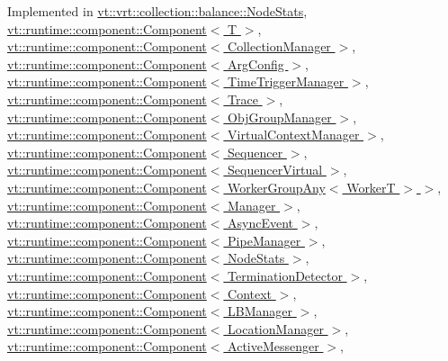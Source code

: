 Implemented in \hyperlink{structvt_1_1vrt_1_1collection_1_1balance_1_1_node_stats_a0c60d1566daa6465f56b09e27058d6a1}{vt\+::vrt\+::collection\+::balance\+::\+Node\+Stats}, \hyperlink{structvt_1_1runtime_1_1component_1_1_component_a7f07384d294e59796add9ce6be2d6410}{vt\+::runtime\+::component\+::\+Component$<$ T $>$}, \hyperlink{structvt_1_1runtime_1_1component_1_1_component_a7f07384d294e59796add9ce6be2d6410}{vt\+::runtime\+::component\+::\+Component$<$ Collection\+Manager $>$}, \hyperlink{structvt_1_1runtime_1_1component_1_1_component_a7f07384d294e59796add9ce6be2d6410}{vt\+::runtime\+::component\+::\+Component$<$ Arg\+Config $>$}, \hyperlink{structvt_1_1runtime_1_1component_1_1_component_a7f07384d294e59796add9ce6be2d6410}{vt\+::runtime\+::component\+::\+Component$<$ Time\+Trigger\+Manager $>$}, \hyperlink{structvt_1_1runtime_1_1component_1_1_component_a7f07384d294e59796add9ce6be2d6410}{vt\+::runtime\+::component\+::\+Component$<$ Trace $>$}, \hyperlink{structvt_1_1runtime_1_1component_1_1_component_a7f07384d294e59796add9ce6be2d6410}{vt\+::runtime\+::component\+::\+Component$<$ Obj\+Group\+Manager $>$}, \hyperlink{structvt_1_1runtime_1_1component_1_1_component_a7f07384d294e59796add9ce6be2d6410}{vt\+::runtime\+::component\+::\+Component$<$ Virtual\+Context\+Manager $>$}, \hyperlink{structvt_1_1runtime_1_1component_1_1_component_a7f07384d294e59796add9ce6be2d6410}{vt\+::runtime\+::component\+::\+Component$<$ Sequencer $>$}, \hyperlink{structvt_1_1runtime_1_1component_1_1_component_a7f07384d294e59796add9ce6be2d6410}{vt\+::runtime\+::component\+::\+Component$<$ Sequencer\+Virtual $>$}, \hyperlink{structvt_1_1runtime_1_1component_1_1_component_a7f07384d294e59796add9ce6be2d6410}{vt\+::runtime\+::component\+::\+Component$<$ Worker\+Group\+Any$<$ Worker\+T $>$ $>$}, \hyperlink{structvt_1_1runtime_1_1component_1_1_component_a7f07384d294e59796add9ce6be2d6410}{vt\+::runtime\+::component\+::\+Component$<$ Manager $>$}, \hyperlink{structvt_1_1runtime_1_1component_1_1_component_a7f07384d294e59796add9ce6be2d6410}{vt\+::runtime\+::component\+::\+Component$<$ Async\+Event $>$}, \hyperlink{structvt_1_1runtime_1_1component_1_1_component_a7f07384d294e59796add9ce6be2d6410}{vt\+::runtime\+::component\+::\+Component$<$ Pipe\+Manager $>$}, \hyperlink{structvt_1_1runtime_1_1component_1_1_component_a7f07384d294e59796add9ce6be2d6410}{vt\+::runtime\+::component\+::\+Component$<$ Node\+Stats $>$}, \hyperlink{structvt_1_1runtime_1_1component_1_1_component_a7f07384d294e59796add9ce6be2d6410}{vt\+::runtime\+::component\+::\+Component$<$ Termination\+Detector $>$}, \hyperlink{structvt_1_1runtime_1_1component_1_1_component_a7f07384d294e59796add9ce6be2d6410}{vt\+::runtime\+::component\+::\+Component$<$ Context $>$}, \hyperlink{structvt_1_1runtime_1_1component_1_1_component_a7f07384d294e59796add9ce6be2d6410}{vt\+::runtime\+::component\+::\+Component$<$ L\+B\+Manager $>$}, \hyperlink{structvt_1_1runtime_1_1component_1_1_component_a7f07384d294e59796add9ce6be2d6410}{vt\+::runtime\+::component\+::\+Component$<$ Location\+Manager $>$}, \hyperlink{structvt_1_1runtime_1_1component_1_1_component_a7f07384d294e59796add9ce6be2d6410}{vt\+::runtime\+::component\+::\+Component$<$ Active\+Messenger $>$}, 